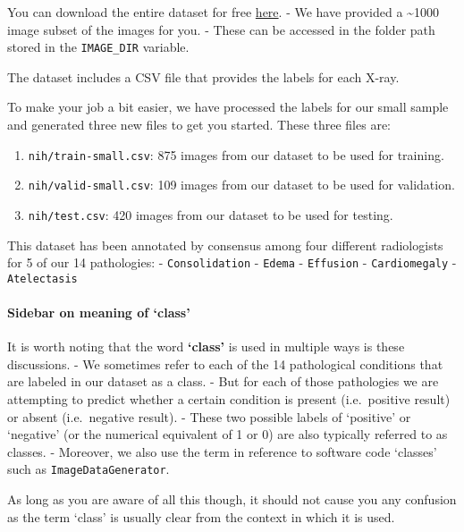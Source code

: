 \documentclass[11pt]{article}
\providecommand{\tightlist}{%
      \setlength{\itemsep}{0pt}\setlength{\parskip}{0pt}}
\begin{document}
You can download the entire dataset for free
\href{https://nihcc.app.box.com/v/ChestXray-NIHCC}{here}. - We have
provided a \textasciitilde{}1000 image subset of the images for you. -
These can be accessed in the folder path stored in the
\texttt{IMAGE\_DIR} variable.

The dataset includes a CSV file that provides the labels for each X-ray.

To make your job a bit easier, we have processed the labels for our
small sample and generated three new files to get you started. These
three files are:

\begin{enumerate}
\def\labelenumi{\arabic{enumi}.}
\tightlist
\item
  \texttt{nih/train-small.csv}: 875 images from our dataset to be used
  for training.
\item
  \texttt{nih/valid-small.csv}: 109 images from our dataset to be used
  for validation.
\item
  \texttt{nih/test.csv}: 420 images from our dataset to be used for
  testing.
\end{enumerate}

This dataset has been annotated by consensus among four different
radiologists for 5 of our 14 pathologies: - \texttt{Consolidation} -
\texttt{Edema} - \texttt{Effusion} - \texttt{Cardiomegaly} -
\texttt{Atelectasis}

    \hypertarget{sidebar-on-meaning-of-class}{%
\paragraph{Sidebar on meaning of
`class'}\label{sidebar-on-meaning-of-class}}

It is worth noting that the word \textbf{`class'} is used in multiple
ways is these discussions. - We sometimes refer to each of the 14
pathological conditions that are labeled in our dataset as a class. -
But for each of those pathologies we are attempting to predict whether a
certain condition is present (i.e.~positive result) or absent
(i.e.~negative result). - These two possible labels of `positive' or
`negative' (or the numerical equivalent of 1 or 0) are also typically
referred to as classes. - Moreover, we also use the term in reference to
software code `classes' such as \texttt{ImageDataGenerator}.

As long as you are aware of all this though, it should not cause you any
confusion as the term `class' is usually clear from the context in which
it is used.
\end{document}
